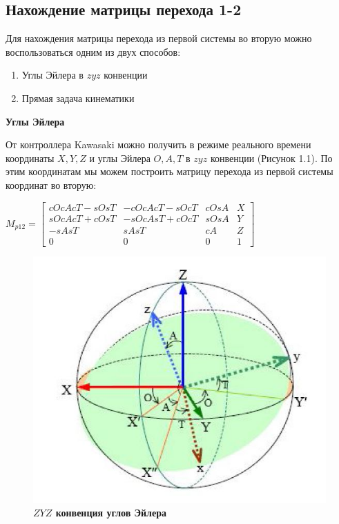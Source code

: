 \documentclass[a4paper,14pt,russian]{extreport} \usepackage{extsizes}
\begin{document}
		\subsection{Нахождение матрицы перехода 1-2}
		Для нахождения матрицы перехода из первой системы во вторую можно воспользоваться одним из двух способов: 
		\begin{enumerate}
			\item Углы Эйлера в $zyz$ конвенции
			\item Прямая задача кинематики
		\end{enumerate}
		
		\textbf{Углы Эйлера}
		
		От контроллера Kawasaki можно получить в режиме реального времени координаты $X,Y,Z$ и углы Эйлера $O, A, T$ в $zyz$ конвенции (Рисунок 1.1). По этим координатам мы можем построить матрицу перехода из первой системы координат во вторую:
		
		${M_{p12}}=\begin{bmatrix} 
		cOcAcT-sOsT & -cOcAcT-sOcT & cOsA & X \\ 
		sOcAcT+cOsT & -sOcAsT+cOcT & sOsA & Y\\
		-sAsT & sAsT & cA & Z \\
		0 & 0 & 0 & 1
		\end{bmatrix}$ 
		
		\begin{figure}[ht]
			\centering		 
			\includegraphics[width=6in]{./img/img21.JPG}	
			\caption{
				\textbf{$ZYZ$ конвенция углов Эйлера
				}     
			}
			\label{fig_img113}
		\end{figure}	
	
\end{document}
